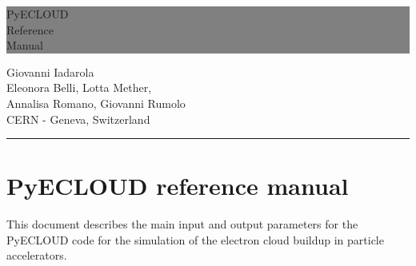 \documentclass[a4paper,12pt]{article}
\newcommand{\HRule}[1]{\hfill \rule{0.2\linewidth}{#1}}
\begin{document}
\thispagestyle{empty} %


\colorbox{Gray}{
	\parbox[t]{1.0\linewidth}{
		\centering \fontsize{50pt}{80pt}\selectfont %
		\vspace*{0.7cm} %
		
		\hfill PyECLOUD \\
		\hfill Reference \\
		\hfill Manual\par
		
		\vspace*{0.7cm} %
	}
}


\vfill %


{\centering \large 
\hfill Giovanni Iadarola \\
\hfill Eleonora Belli, Lotta Mether,\\ 
\hfill Annalisa Romano, Giovanni Rumolo\\
\hfill CERN - Geneva, Switzerland

\HRule{1pt}} %


\clearpage %

\newpage

\section*{PyECLOUD reference manual}

This document describes the main input and output parameters for the PyECLOUD code for the simulation of the electron cloud buildup in particle accelerators.
\end{document}
